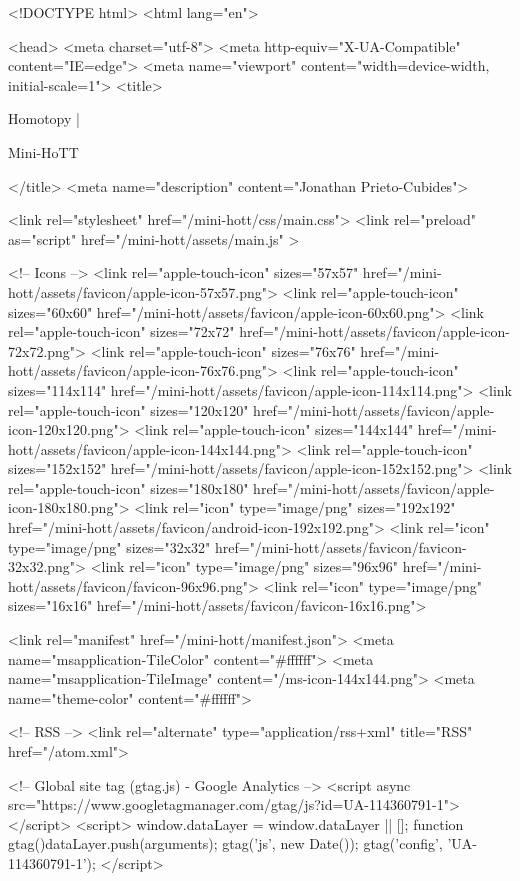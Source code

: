 <!DOCTYPE html>
<html lang="en">

<head>
  <meta charset="utf-8">
  <meta http-equiv="X-UA-Compatible" content="IE=edge">
  <meta name="viewport" content="width=device-width, initial-scale=1">
  <title>
    
      
        Homotopy |
      
        Mini-HoTT
    
  </title>
  <meta name="description" content="Jonathan Prieto-Cubides">

  <link rel="stylesheet" href="/mini-hott/css/main.css">
  <link rel="preload" as="script" href="/mini-hott/assets/main.js" >

  <!-- Icons -->
  <link rel="apple-touch-icon" sizes="57x57" href="/mini-hott/assets/favicon/apple-icon-57x57.png">
  <link rel="apple-touch-icon" sizes="60x60" href="/mini-hott/assets/favicon/apple-icon-60x60.png">
  <link rel="apple-touch-icon" sizes="72x72" href="/mini-hott/assets/favicon/apple-icon-72x72.png">
  <link rel="apple-touch-icon" sizes="76x76" href="/mini-hott/assets/favicon/apple-icon-76x76.png">
  <link rel="apple-touch-icon" sizes="114x114" href="/mini-hott/assets/favicon/apple-icon-114x114.png">
  <link rel="apple-touch-icon" sizes="120x120" href="/mini-hott/assets/favicon/apple-icon-120x120.png">
  <link rel="apple-touch-icon" sizes="144x144" href="/mini-hott/assets/favicon/apple-icon-144x144.png">
  <link rel="apple-touch-icon" sizes="152x152" href="/mini-hott/assets/favicon/apple-icon-152x152.png">
  <link rel="apple-touch-icon" sizes="180x180" href="/mini-hott/assets/favicon/apple-icon-180x180.png">
  <link rel="icon" type="image/png" sizes="192x192"  href="/mini-hott/assets/favicon/android-icon-192x192.png">
  <link rel="icon" type="image/png" sizes="32x32" href="/mini-hott/assets/favicon/favicon-32x32.png">
  <link rel="icon" type="image/png" sizes="96x96" href="/mini-hott/assets/favicon/favicon-96x96.png">
  <link rel="icon" type="image/png" sizes="16x16" href="/mini-hott/assets/favicon/favicon-16x16.png">

  <link rel="manifest" href="/mini-hott/manifest.json">
  <meta name="msapplication-TileColor" content="#ffffff">
  <meta name="msapplication-TileImage" content="/ms-icon-144x144.png">
  <meta name="theme-color" content="#ffffff">

  <!-- RSS -->
  <link rel="alternate" type="application/rss+xml" title="RSS" href="/atom.xml">

  <!-- Global site tag (gtag.js) - Google Analytics -->
  <script async src="https://www.googletagmanager.com/gtag/js?id=UA-114360791-1"></script>
  <script>
    window.dataLayer = window.dataLayer || [];
    function gtag(){dataLayer.push(arguments);}
    gtag('js', new Date());
    gtag('config', 'UA-114360791-1');
  </script>

